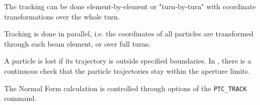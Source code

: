 The tracking can be done element-by-element or "turn-by-turn" with
coordinate transformations over the whole turn.  

Tracking is done in parallel, i.e. the coordinates of all particles are
transformed through each beam element, or over full turns. 

A particle is lost if its trajectory is outside specified boundaries. 
In \ptc, there is a continuous check that the particle trajectories stay
within the aperture limits.  

The Normal Form calculation is controlled through options of the 
{\tt PTC\_TRACK} command.



